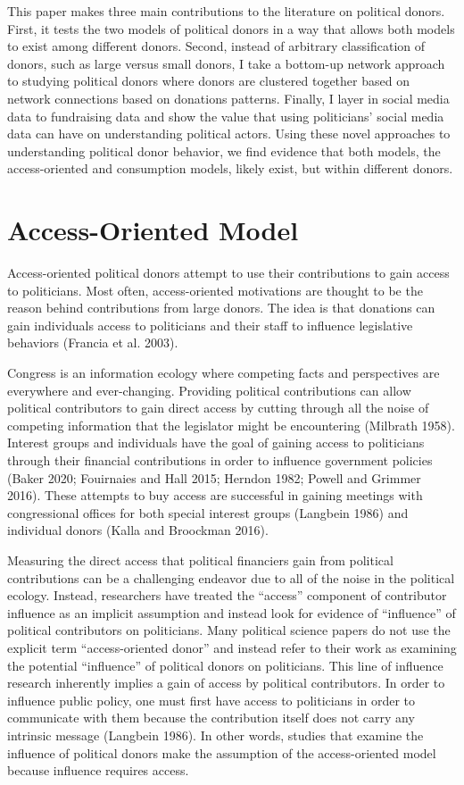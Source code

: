 \documentclass[12pt,]{article}
\begin{document}
This paper makes three main contributions to the literature on political
donors. First, it tests the two models of political donors in a way that
allows both models to exist among different donors. Second, instead of
arbitrary classification of donors, such as large versus small donors, I
take a bottom-up network approach to studying political donors where
donors are clustered together based on network connections based on
donations patterns. Finally, I layer in social media data to fundraising
data and show the value that using politicians' social media data can
have on understanding political actors. Using these novel approaches to
understanding political donor behavior, we find evidence that both
models, the access-oriented and consumption models, likely exist, but
within different donors.

\hypertarget{access-oriented-model}{%
\section{Access-Oriented Model}\label{access-oriented-model}}

Access-oriented political donors attempt to use their contributions to
gain access to politicians. Most often, access-oriented motivations are
thought to be the reason behind contributions from large donors. The
idea is that donations can gain individuals access to politicians and
their staff to influence legislative behaviors (Francia et al. 2003).

Congress is an information ecology where competing facts and
perspectives are everywhere and ever-changing. Providing political
contributions can allow political contributors to gain direct access by
cutting through all the noise of competing information that the
legislator might be encountering (Milbrath 1958). Interest groups and
individuals have the goal of gaining access to politicians through their
financial contributions in order to influence government policies (Baker
2020; Fouirnaies and Hall 2015; Herndon 1982; Powell and Grimmer 2016).
These attempts to buy access are successful in gaining meetings with
congressional offices for both special interest groups (Langbein 1986)
and individual donors (Kalla and Broockman 2016).

Measuring the direct access that political financiers gain from
political contributions can be a challenging endeavor due to all of the
noise in the political ecology. Instead, researchers have treated the
``access'' component of contributor influence as an implicit assumption
and instead look for evidence of ``influence'' of political contributors
on politicians. Many political science papers do not use the explicit
term ``access-oriented donor'' and instead refer to their work as
examining the potential ``influence'' of political donors on
politicians. This line of influence research inherently implies a gain
of access by political contributors. In order to influence public
policy, one must first have access to politicians in order to
communicate with them because the contribution itself does not carry any
intrinsic message (Langbein 1986). In other words, studies that examine
the influence of political donors make the assumption of the
access-oriented model because influence requires access.
\end{document}
